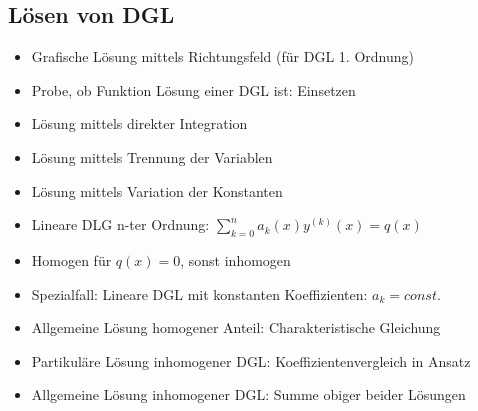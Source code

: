 \documentclass[a4paper,10pt]{article}
\begin{document}
\begin{multicols}{2}
\section {Lösen von DGL}
\begin{itemize}
\item Grafische Lösung mittels Richtungsfeld (für DGL 1. Ordnung)
\item Probe, ob Funktion Lösung einer DGL ist: Einsetzen
\item Lösung mittels direkter Integration
\item Lösung mittels Trennung der Variablen
\item Lösung mittels Variation der Konstanten
\item Lineare DLG n-ter Ordnung: $\sum_{k=0}^n a_k(x) y^{(k)}(x) = q(x)$
\item Homogen für $q(x) = 0$, sonst inhomogen
\item Spezialfall: Lineare DGL mit konstanten Koeffizienten: $a_k = const.$
\item Allgemeine Lösung homogener Anteil: Charakteristische Gleichung
\item Partikuläre Lösung inhomogener DGL: Koeffizientenvergleich in Ansatz
\item Allgemeine Lösung inhomogener DGL: Summe obiger beider Lösungen
\end{itemize}

\end{multicols}
\end{document}

